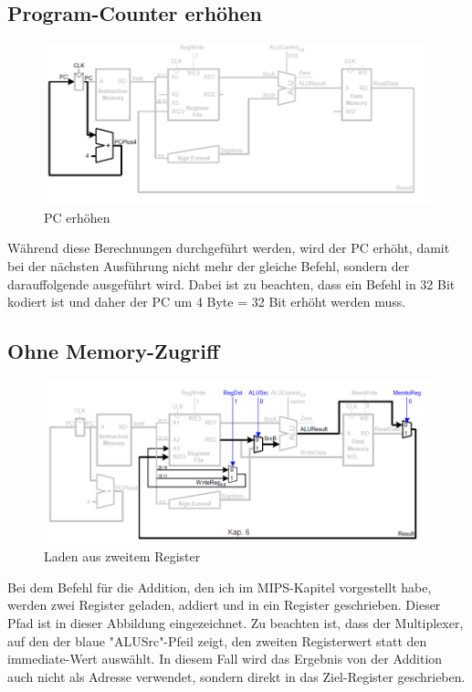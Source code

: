 \documentclass[12pt, a4paper]{article}
\begin{document}
\subsection{Program-Counter erhöhen}
\begin{figure}[H]
	\begin{center}
		\includegraphics [width=17cm]{Prozessor5.png}
	\end{center}
	\caption{PC erhöhen}
\end{figure}

Während diese Berechnungen durchgeführt werden, wird der PC erhöht, damit bei der nächsten Ausführung nicht mehr der gleiche Befehl, sondern der darauffolgende ausgeführt wird. Dabei ist zu beachten, dass ein Befehl in 32 Bit kodiert ist und daher der PC um 4 Byte = 32 Bit erhöht werden muss. 

\subsection{Ohne Memory-Zugriff}
\begin{figure}[H]
	\begin{center}
		\includegraphics [width=17cm]{Prozessor6.png}
	\end{center}
	\caption{Laden aus zweitem Register}
\end{figure}

Bei dem Befehl für die Addition, den ich im MIPS-Kapitel vorgestellt habe, werden zwei Register geladen, addiert und in ein Register geschrieben. Dieser Pfad ist in dieser Abbildung eingezeichnet. Zu beachten ist, dass der Multiplexer, auf den der blaue "ALUSrc"-Pfeil zeigt, den zweiten Registerwert statt den immediate-Wert auswählt. In diesem Fall wird das Ergebnis von der Addition auch nicht als Adresse verwendet, sondern direkt in das Ziel-Register geschrieben.
\end{document}
